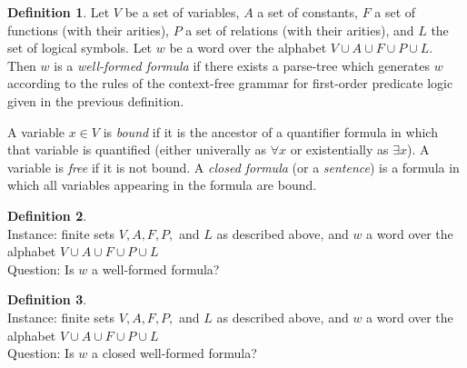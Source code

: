 \documentclass[draft]{article}
\theoremstyle{remark} \newtheorem{technicality}{Technical note}
\theoremstyle{definition} \newtheorem{definition}{Definition}
\newenvironment{langdef}[1]{\begin{definition}{\lang{#1}}}{\end{definition}}
\newenvironment{instance}{\\Instance:}{}
\newenvironment{question}{\\Question:}{}
\begin{document}
\begin{definition}
  Let $V$ be a set of variables, $A$ a set of constants, $F$ a set of functions (with their arities), $P$ a set of relations (with their arities), and $L$ the set of logical symbols.
  Let $w$ be a word over the alphabet $V\cup A\cup F\cup P\cup L$.
  Then $w$ is a \emph{well-formed formula} if there exists a parse-tree which generates $w$ according to the rules of the context-free grammar for first-order predicate logic given in the previous definition.

  A variable $x\in V$ is \emph{bound} if it is the ancestor of a quantifier formula in which that variable is quantified (either univerally as $\forall x$ or existentially as $\exists x$).
  A variable is \emph{free} if it is not bound.
  A \emph{closed formula} (or a \emph{sentence}) is a formula in which all variables appearing in the formula are bound.
\end{definition}

\begin{langdef}{PARSEABLE}
  \begin{instance}
    finite sets $V, A, F, P,$ and $L$ as described above, and $w$ a word over the alphabet $V\cup A\cup F\cup P\cup L$
  \end{instance}
  \begin{question}
    Is $w$ a well-formed formula?
  \end{question}
\end{langdef}

\begin{langdef}{CLOSED}
  \begin{instance}
    finite sets $V, A, F, P,$ and $L$ as described above, and $w$ a word over the alphabet $V\cup A\cup F\cup P\cup L$
  \end{instance}
  \begin{question}
    Is $w$ a closed well-formed formula?
  \end{question}
\end{langdef}
\end{document}
